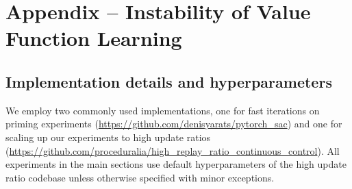 \chapter{Appendix -- Instability of Value Function Learning}

\section{Implementation details and hyperparameters} \label{app:impl}

We employ two commonly used implementations, one for fast iterations on priming experiments (\href{https://github.com/denisyarats/pytorch\_sac}{https://github.com/denisyarats/pytorch\_sac}) and one for scaling up our experiments to high update ratios (\href{https://github.com/proceduralia/high\_replay\_ratio\_continuous\_control}{https://github.com/proceduralia/high\_replay\_ratio\_continuous\_control}). All experiments in the main sections use default hyperparameters of the high update ratio codebase  unless otherwise specified with minor exceptions.

